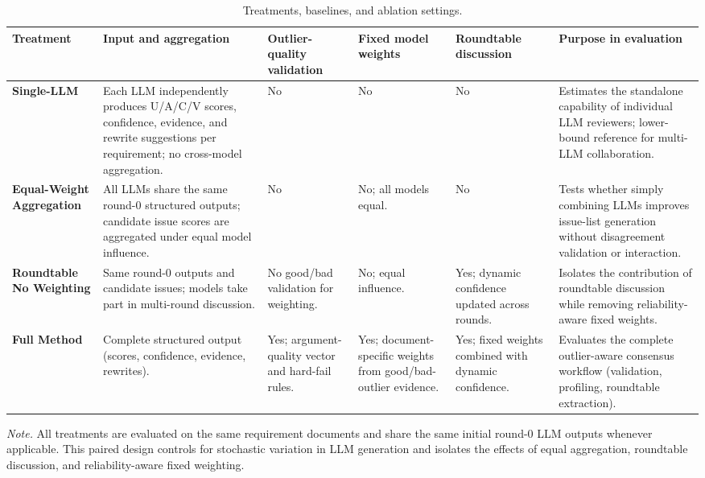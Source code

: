 \begin{table}[!ht]
\centering
\caption{Treatments, baselines, and ablation settings.}
\label{tab:treatments_baselines}
\scriptsize
\setlength{\tabcolsep}{4pt}
\renewcommand{\arraystretch}{1.2}
\begin{tabularx}{\textwidth}{p{1.6cm} X p{1.5cm} p{1.5cm} p{1.7cm} X}
\toprule
\textbf{Treatment} &
\textbf{Input and aggregation} &
\textbf{Outlier-quality validation} &
\textbf{Fixed model weights} &
\textbf{Roundtable discussion} &
\textbf{Purpose in evaluation} \\
\midrule
\textbf{Single-LLM} &
Each LLM independently produces U/A/C/V scores, confidence, evidence, and rewrite suggestions per requirement; no cross-model aggregation. &
No & No & No &
Estimates the standalone capability of individual LLM reviewers; lower-bound reference for multi-LLM collaboration. \\
\midrule
\textbf{Equal-Weight Aggregation} &
All LLMs share the same round-0 structured outputs; candidate issue scores are aggregated under equal model influence. &
No & No; all models equal. & No &
Tests whether simply combining LLMs improves issue-list generation without disagreement validation or interaction. \\
\midrule
\textbf{Roundtable No Weighting} &
Same round-0 outputs and candidate issues; models take part in multi-round discussion. &
No good/bad validation for weighting. & No; equal influence. & Yes; dynamic confidence updated across rounds. &
Isolates the contribution of roundtable discussion while removing reliability-aware fixed weights. \\
\midrule
\textbf{Full Method} &
Complete structured output (scores, confidence, evidence, rewrites). &
Yes; argument-quality vector and hard-fail rules. & Yes; document-specific weights from good/bad-outlier evidence. & Yes; fixed weights combined with dynamic confidence. &
Evaluates the complete outlier-aware consensus workflow (validation, profiling, roundtable extraction). \\
\bottomrule
\end{tabularx}

\par\vspace{0.4em}
{\footnotesize \textit{Note.} All treatments are evaluated on the same requirement documents and share the same initial round-0 LLM outputs whenever applicable. This paired design controls for stochastic variation in LLM generation and isolates the effects of equal aggregation, roundtable discussion, and reliability-aware fixed weighting.\par}
\end{table}
